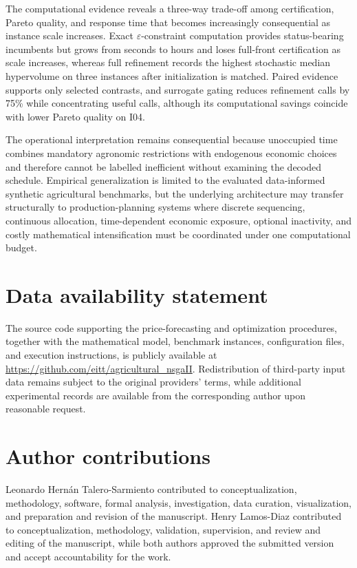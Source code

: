 \documentclass[]{interact}
\begin{document}
The computational evidence reveals a three-way trade-off among certification, Pareto quality, and response time that becomes increasingly consequential as instance scale increases. Exact $\varepsilon$-constraint computation provides status-bearing incumbents but grows from seconds to hours and loses full-front certification as scale increases, whereas full refinement records the highest stochastic median hypervolume on three instances after initialization is matched. Paired evidence supports only selected contrasts, and surrogate gating reduces refinement calls by 75\% while concentrating useful calls, although its computational savings coincide with lower Pareto quality on I04.

The operational interpretation remains consequential because unoccupied time combines mandatory agronomic restrictions with endogenous economic choices and therefore cannot be labelled inefficient without examining the decoded schedule. Empirical generalization is limited to the evaluated data-informed synthetic agricultural benchmarks, but the underlying architecture may transfer structurally to production-planning systems where discrete sequencing, continuous allocation, time-dependent economic exposure, optional inactivity, and costly mathematical intensification must be coordinated under one computational budget.

\section*{Data availability statement}

The source code supporting the price-forecasting and optimization procedures, together with the mathematical model, benchmark instances, configuration files, and execution instructions, is publicly available at \url{https://github.com/eitt/agricultural_nsgaII}. Redistribution of third-party input data remains subject to the original providers' terms, while additional experimental records are available from the corresponding author upon reasonable request.

\section*{Author contributions}

Leonardo Hern\'an Talero-Sarmiento contributed to conceptualization, methodology, software, formal analysis, investigation, data curation, visualization, and preparation and revision of the manuscript. Henry Lamos-Diaz contributed to conceptualization, methodology, validation, supervision, and review and editing of the manuscript, while both authors approved the submitted version and accept accountability for the work.
\end{document}
